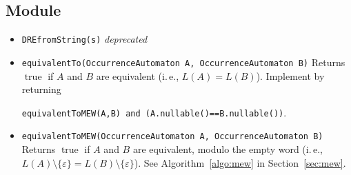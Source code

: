\documentclass[a4paper,11pt, svgnames,titlepage]{article}
\newcommand{\emptyword}{\varepsilon}
\DeclareMathOperator{\incomp}{\#}
\newcommand{\true}{\ensuremath{\operatorname{true}}\xspace}
\begin{document}
\subsection{Module}\label{sec:des:mod}
\begin{itemize}
	\item\texttt{DREfromString(s)} \emph{deprecated}
\item\texttt{equivalentTo(OccurrenceAutomaton A, OccurrenceAutomaton B)} Returns $\true$ if $A$ and $B$ are equivalent (i.\,e., $L(A)=L(B)$). Implement by returning 
\begin{center}
	\texttt{equivalentToMEW(A,B) and (A.nullable()==B.nullable())}.
\end{center}
\item\texttt{equivalentToMEW(OccurrenceAutomaton A, OccurrenceAutomaton B)} Returns $\true$ if $A$ and $B$ are equivalent, modulo the empty word (i.\,e., $L(A)\setminus\{\emptyword\}=L(B)\setminus\{\emptyword\}$). See Algorithm~\ref{algo:mew} in Section~\ref{sec:mew}.

\end{itemize}
\end{document}
